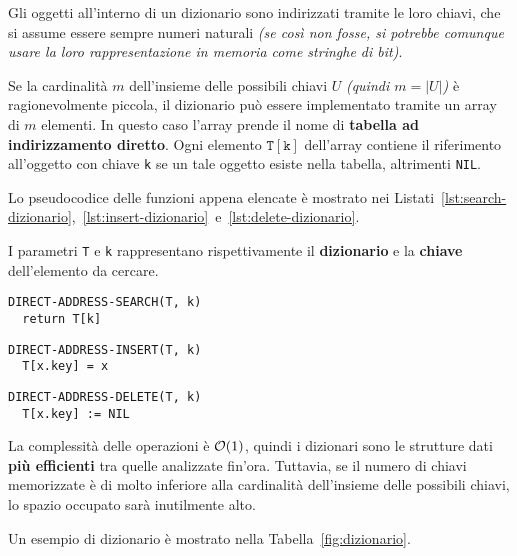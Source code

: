 \documentclass[italian, 10pt]{article}
\begin{document}
Gli oggetti all'interno di un dizionario sono indirizzati tramite le loro chiavi, che si assume essere sempre numeri naturali \textit{(se così non fosse, si potrebbe comunque usare la loro rappresentazione in memoria come stringhe di bit)}.

Se la cardinalità \(m\) dell'insieme delle possibili chiavi \(U\) \textit{(quindi \(m = |U|\))} è ragionevolmente piccola, il dizionario può essere implementato tramite un array di \(m\) elementi.
In questo caso l'array prende il nome di \textbf{tabella ad indirizzamento diretto}.
Ogni elemento \(\texttt{T}[\texttt{k}]\) dell'array contiene il riferimento all'oggetto con chiave \texttt{k} se un tale oggetto esiste nella tabella, altrimenti \texttt{NIL}.

\bigskip
Lo pseudocodice delle funzioni appena elencate è mostrato nei Listati~\ref{lst:search-dizionario},~\ref{lst:insert-dizionario}~e~\ref{lst:delete-dizionario}.

I parametri \texttt{T} e \texttt{k} rappresentano rispettivamente il \textbf{dizionario} e la \textbf{chiave} dell'elemento da cercare.

\begin{minipage}{\textwidth}
  \begin{lstlisting}[numbers=none, style=pseudocode, caption={Ricerca}, label={lst:search-dizionario}]
DIRECT-ADDRESS-SEARCH(T, k)
  return T[k]
\end{lstlisting}

  \begin{lstlisting}[style=pseudocode, caption={Inserimento}, label={lst:insert-dizionario}]
DIRECT-ADDRESS-INSERT(T, k)
  T[x.key] = x
\end{lstlisting}

  \begin{lstlisting}[numbers=none, style=pseudocode, caption={Cancellazione}, label={lst:delete-dizionario}]
DIRECT-ADDRESS-DELETE(T, k)
  T[x.key] := NIL
\end{lstlisting}
\end{minipage}

La complessità delle operazioni è \(\mathcal{O}(1)\), quindi i dizionari sono le strutture dati \textbf{più efficienti} tra quelle analizzate fin'ora.
Tuttavia, se il numero di chiavi memorizzate è di molto inferiore alla cardinalità dell'insieme delle possibili chiavi, lo spazio occupato sarà inutilmente alto.

\bigskip
Un esempio di dizionario è mostrato nella Tabella~\ref{fig:dizionario}.
\end{document}
